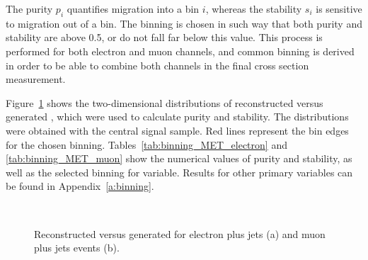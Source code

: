 The purity $p_i$ quantifies migration into a bin $i$, whereas the stability $s_i$ is sensitive to migration out of a
bin. The binning is chosen in such way that both purity and stability are above \num{0.5}, or do not fall far below this
value. This process is performed for both electron and muon channels, and common binning is derived in order to be able
to combine both channels in the final cross section measurement.

Figure~\ref{fig:choice_of_bins_MET} shows the two-dimensional distributions of reconstructed versus generated \MET,
which were used to calculate purity and stability. The distributions were obtained with the central signal
\ttbar sample. Red lines represent the bin edges for the chosen binning. Tables~\ref{tab:binning_MET_electron} and
\ref{tab:binning_MET_muon} show the numerical values of purity and stability, as well as the selected binning for \MET
variable. Results for other primary variables can be found in Appendix~\ref{a:binning}.



\begin{figure}[!htbp]
	\centering
	\hfill
	\\
	\caption{Reconstructed versus generated \MET for electron plus jets (a) and muon plus jets events (b).}
	\label{fig:choice_of_bins_MET}
 \end{figure}

